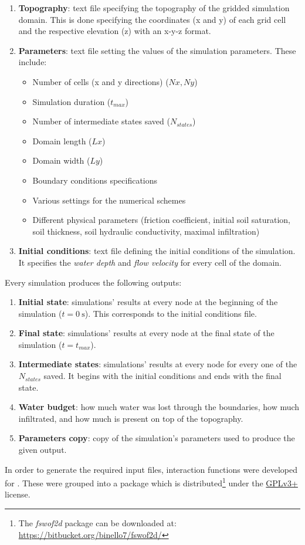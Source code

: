\begin{enumerate}
\itemsep0em
  \item \textbf{Topography}: text file specifying the topography of the gridded simulation domain. This is done specifying the coordinates (x and y) of each grid cell and the respective elevation (z) with an x-y-z format.
  \item \textbf{Parameters}: text file setting the values of the simulation parameters. These include:
  \begin{itemize}
    \itemsep0em
    \item Number of cells (x and y directions) ($Nx, Ny$)
    \item Simulation duration ($t_{max}$)
    \item Number of intermediate states saved ($N_{states}$)
    \item Domain length ($Lx$)
    \item Domain width ($Ly$)
    \item Boundary conditions specifications
    \item Various settings for the numerical schemes
    \item Different physical parameters (friction coefficient, initial soil saturation, soil thickness, soil hydraulic conductivity, maximal infiltration)
\end{itemize}
  \item \textbf{Initial conditions}: text file defining the initial conditions of the simulation. It specifies the \emph{water depth} and \emph{flow velocity} for every cell of the domain.
\end{enumerate}

\noindent Every simulation produces the following outputs:

\begin{enumerate}
\itemsep0em
  \item \textbf{Initial state}: simulations' results at every node at the beginning of the simulation ($t = \SI{0}{\s}$). This corresponds to the initial conditions file.
  \item \textbf{Final state}: simulations' results at every node at the final state of the simulation ($t = t_{max}$).
  \item \textbf{Intermediate states}: simulations' results at every node for every one of the $N_{states}$ saved. It begins with the initial conditions and ends with the final state.
  \item \textbf{Water budget}: how much water was lost through the boundaries, how much infiltrated, and how much is present on top of the topography.
  \item \textbf{Parameters copy}: copy of the simulation's parameters used to produce the given output.
\end{enumerate}


\noindent In order to generate the required input files, interaction functions were developed for . These were grouped into a package which is distributed\footnote{The \emph{fswof2d} package can be downloaded at: \url{https://bitbucket.org/binello7/fswof2d/}} under the \href{https://www.gnu.org/licenses/quick-guide-gplv3.en.html}{GPLv3+} license.



